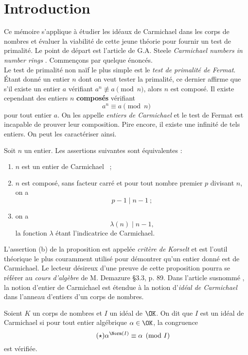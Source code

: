 \section*{Introduction}

Ce mémoire s'applique à étudier les idéaux de Carmichael dans les corps de nombres et évaluer la viabilité de cette jeune théorie pour fournir un test de primalité. Le point de départ est l'article de G.A. Steele \textit{Carmichael numbers in number rings} \cite{article}. Commençons par quelque énoncés. \\

Le test de primalité non naïf le plus simple est le \emph{test de primalité de Fermat}. Étant donné un entier $n$ dont on veut tester la primalité, ce dernier affirme que s'il existe un entier $a$ vérifiant $a^n \not \equiv a \pmod{n}$, alors $n$ est composé. Il existe cependant des entiers $n$ \textbf{composés} vérifiant $$a^n \equiv a\pmod{n}$$ pour tout entier $a$. On les appelle \emph{entiers de Carmichael} et le test de Fermat est incapable de prouver leur composition. Pire encore, il existe une infinité de tels entiers. On peut les caractériser ainsi.

\begin{proposition}\label{korselt} Soit $n$ un entier. Les assertions suivantes sont équivalentes :
	\begin{enumerate}[font=\normalshape]
		\item $n$ est un entier de Carmichael ~;
		\item $n$ est composé, sans facteur carré et pour tout nombre premier $p$ divisant $n$, on a $$p-1 \mid n-1 ~;$$
		\item on a $$ \lambda(n) \mid n-1 ,$$ la fonction $\lambda$ étant l'indicatrice de Carmichael.
	\end{enumerate}
\end{proposition}

L'assertion (b) de la proposition est appelée \textit{critère de Korselt} et est l'outil théorique le plus couramment utilisé pour démontrer qu'un entier donné est de Carmichael. Le lecteur désireux d'une preuve de cette proposition pourra se référer au \textit{cours d'algèbre} de M. Demazure \cite{Demazure} §3.3, p. 89. Dans l'article susnommé \cite{article}, la notion d'entier de Carmichael est étendue à la notion d'\emph{idéal de Carmichael} dans l'anneau d'entiers d'un corps de nombres.

\begin{definition} Soient $K$ un corps de nombres et $I$ un idéal de $\OK$. On dit que $I$ est un idéal de Carmichael si pour tout entier algébrique $\alpha \in \OK$, la congruence
	\begin{equation}\label{congruence-Carmichael}\tag{$\star$}
		\alpha^{\Norm(I)} \equiv \alpha \pmod{I}
	\end{equation}
est vérifiée.
\end{definition}

